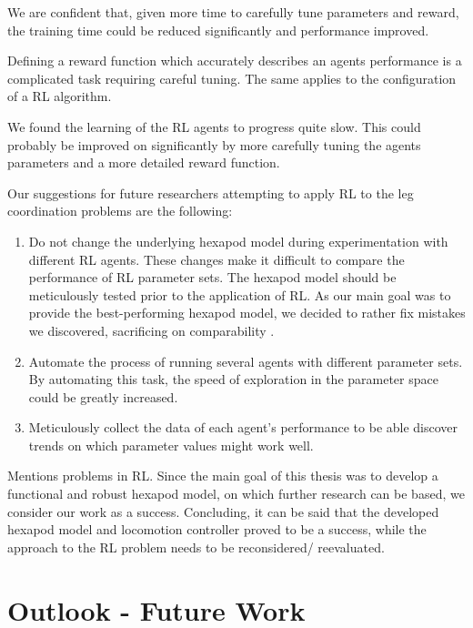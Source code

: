 We are confident that, given more time to carefully tune parameters and reward, the training time could be reduced significantly and performance improved.

Defining a reward function which accurately describes an agents performance is a complicated task requiring careful tuning.
The same applies to the configuration of a RL algorithm.

We found the learning of the RL agents to progress quite slow. 
This could probably be improved on significantly by more carefully tuning the agents parameters and a more detailed reward function.

Our suggestions for future researchers attempting to apply RL to the leg coordination problems are the following:
\begin{enumerate}
	\item Do not change the underlying hexapod model during experimentation with different RL agents. 
	These changes make it difficult to compare the performance of RL parameter sets.
	The hexapod model should be meticulously tested prior to the application of RL.
	As our main goal was to provide the best-performing hexapod model, we decided to rather fix mistakes we discovered, sacrificing on comparability .
	
	\item Automate the process of running several agents with different parameter sets. 
	By automating this task, the speed of exploration in the parameter space could be greatly increased.
	
	\item Meticulously collect the data of each agent's performance to be able discover trends on which parameter values might work well.
	
\end{enumerate}

Mentions problems in RL.
Since the main goal of this thesis was to develop a functional and robust hexapod model, on which further research can be based, we consider our work as a success.
Concluding, it can be said that the developed hexapod model and locomotion controller proved to be a success, while the approach to the RL problem needs to be reconsidered/ reevaluated.


\section{Outlook - Future Work}

